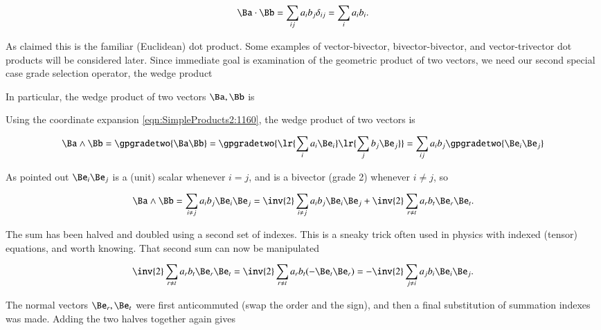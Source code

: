 \begin{dmath}\label{eqn:SimpleProducts2:1200}
\Ba \cdot \Bb
=
\sum_{ij} a_i b_j \delta_{ij}
=
\sum_{i} a_i b_i.
\end{dmath}

As claimed this is the familiar (Euclidean) dot product.
Some examples of vector-bivector, bivector-bivector, and vector-trivector dot products will be considered later.
Since immediate goal is examination of the geometric product of two vectors, we need our second special case grade selection operator, the wedge product


In particular, the wedge product of two vectors \( \Ba, \Bb \) is


Using the coordinate expansion \cref{eqn:SimpleProducts2:1160}, the wedge product of two vectors is

\begin{dmath}\label{eqn:SimpleProducts2:1240}
\Ba \wedge \Bb
=
\gpgradetwo{ \Ba \Bb }
=
\gpgradetwo{ \lr{ \sum_i a_i \Be_i }
\lr{ \sum_j b_j \Be_j }
}
=
\sum_{ij} a_i b_j \gpgradetwo{ \Be_i \Be_j }
\end{dmath}

As pointed out \( \Be_i \Be_j \) is a (unit) scalar whenever \( i = j \), and is a bivector (grade 2) whenever \( i \ne j \), so

\begin{dmath}\label{eqn:SimpleProducts2:1260}
\Ba \wedge \Bb
=
\sum_{i \ne j} a_i b_j \Be_i \Be_j
=
\inv{2}
\sum_{i \ne j} a_i b_j
\Be_i \Be_j
+
\inv{2}
\sum_{r \ne t} a_r b_t
\Be_r \Be_t.
\end{dmath}

The sum has been halved and doubled using a second set of indexes.  This is a sneaky trick often used in physics with indexed (tensor) equations, and worth knowing.  That second sum can now be manipulated

\begin{dmath}\label{eqn:SimpleProducts2:1280}
\inv{2}
\sum_{r \ne t} a_r b_t
\Be_r \Be_t
=
\inv{2}
\sum_{r \ne t} a_r b_t
(-\Be_t \Be_r)
=
-\inv{2}
\sum_{j \ne i} a_j b_i
\Be_i \Be_j.
\end{dmath}

The normal vectors \( \Be_r, \Be_t \) were first anticommuted (swap the order and the sign), and then a final substitution of summation indexes was made.  Adding the two halves together again gives

